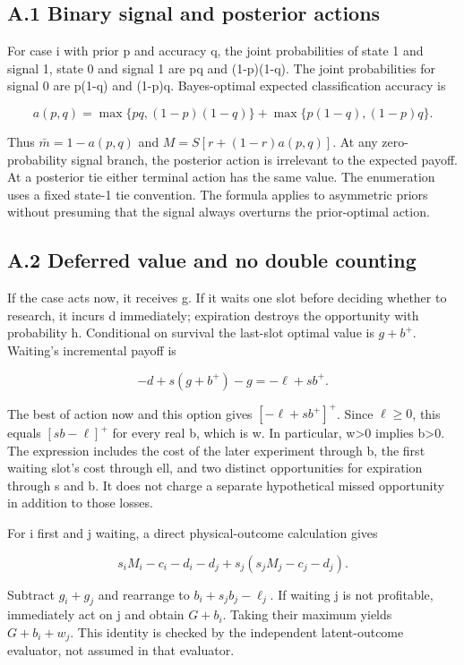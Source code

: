 \documentclass[
  11pt,
]{article}
\begin{document}
\subsection{A.1 Binary signal and posterior
actions}\label{a.1-binary-signal-and-posterior-actions}

For case i with prior p and accuracy q, the joint probabilities of state
1 and signal 1, state 0 and signal 1 are pq and (1-p)(1-q). The joint
probabilities for signal 0 are p(1-q) and (1-p)q. Bayes-optimal expected
classification accuracy is

\[a(p,q)=\max\{pq,(1-p)(1-q)\}+\max\{p(1-q),(1-p)q\}.\]

Thus \(\bar m=1-a(p,q)\) and \(M=S[r+(1-r)a(p,q)]\). At any
zero-probability signal branch, the posterior action is irrelevant to
the expected payoff. At a posterior tie either terminal action has the
same value. The enumeration uses a fixed state-1 tie convention. The
formula applies to asymmetric priors without presuming that the signal
always overturns the prior-optimal action.

\subsection{A.2 Deferred value and no double
counting}\label{a.2-deferred-value-and-no-double-counting}

If the case acts now, it receives g. If it waits one slot before
deciding whether to research, it incurs d immediately; expiration
destroys the opportunity with probability h. Conditional on survival the
last-slot optimal value is \(g+b^+\). Waiting's incremental payoff is

\[-d+s(g+b^+)-g=-\ell+sb^+.\]

The best of action now and this option gives \([-\ell+sb^+]^+\). Since
\(\ell\geq0\), this equals \([sb-\ell]^+\) for every real b, which is w.
In particular, w\textgreater0 implies b\textgreater0. The expression
includes the cost of the later experiment through b, the first waiting
slot's cost through ell, and two distinct opportunities for expiration
through s and b. It does not charge a separate hypothetical missed
opportunity in addition to those losses.

For i first and j waiting, a direct physical-outcome calculation gives

\[s_iM_i-c_i-d_i-d_j+s_j(s_jM_j-c_j-d_j).\]

Subtract \(g_i+g_j\) and rearrange to \(b_i+s_jb_j-\ell_j\). If waiting
j is not profitable, immediately act on j and obtain \(G+b_i\). Taking
their maximum yields \(G+b_i+w_j\). This identity is checked by the
independent latent-outcome evaluator, not assumed in that evaluator.
\end{document}
